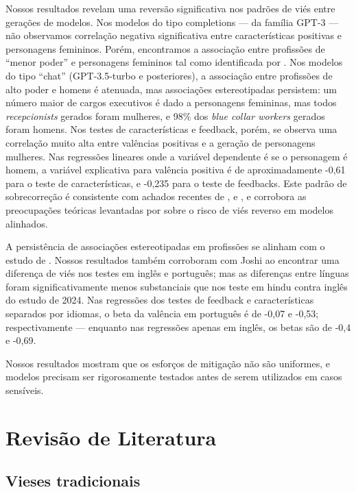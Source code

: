 \documentclass[12pt,a4paper]{article}
\begin{document}
Nossos resultados revelam uma reversão significativa nos padrões de viés
entre gerações de modelos. Nos modelos do tipo completions --- da
família GPT-3 --- não observamos correlação negativa significativa entre
características positivas e personagens femininos. Porém, encontramos a
associação entre profissões de ``menor poder'' e personagens femininos tal
como identificada por \citet{lucy2021}. Nos modelos do tipo
``chat'' (GPT-3.5-turbo e posteriores), a associação entre
profissões de alto poder e homens é atenuada, mas associações
estereotipadas persistem: um número maior de cargos executivos é dado a
personagens femininas, mas todos \textit{recepcionists} gerados foram mulheres,
e 98\% dos \textit{blue collar workers} gerados foram homens. Nos testes de
características e feedback, porém, se observa uma correlação muito alta
entre valências positivas e a geração de personagens mulheres. Nas
regressões lineares onde a variável dependente é se o personagem é
homem, a variável explicativa para valência positiva é de
aproximadamente -0,61 para o teste de características, e -0,235 para o
teste de feedbacks. Este padrão de sobrecorreção é consistente com
achados recentes de \citet{mirza2024}, \citet{karvonen2025} e \citet{balestri2024,balestri2025}, e corrobora as preocupações teóricas levantadas
por \citet{liu2025} sobre o risco de viés reverso em modelos
alinhados.

A persistência de associações estereotipadas em profissões se alinham
com o estudo de \citet{joshi2024}. Nossos resultados também corroboram
com Joshi ao encontrar uma diferença de viés nos testes em inglês e
português; mas as diferenças entre línguas foram significativamente
menos substanciais que nos teste em hindu contra inglês do estudo de
2024. Nas regressões dos testes de feedback e características separados
por idiomas, o beta da valência em português é de -0,07 e -0,53;
respectivamente --- enquanto nas regressões apenas em inglês, os betas
são de -0,4 e -0,69.

Nossos resultados mostram que os esforços de mitigação não são
uniformes, e modelos precisam ser rigorosamente testados antes de serem
utilizados em casos sensíveis.


\section{Revisão de Literatura}



\subsection{Vieses tradicionais}
\end{document}
